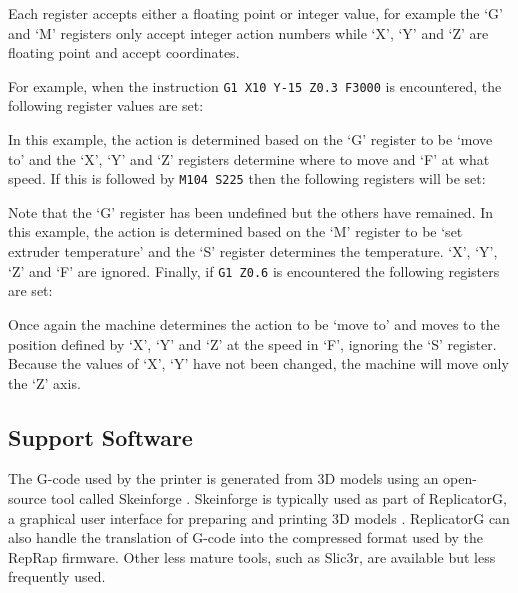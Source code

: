			Each register accepts either a floating point or integer value, for
			example the `G' and `M' registers only accept integer action numbers while
			`X', `Y' and `Z' are floating point and accept coordinates.
			
			For example, when the instruction \verb|G1 X10 Y-15 Z0.3 F3000| is encountered,
			the following register values are set:
			
			\begin{gcoderegs}
			\end{gcoderegs}
			
			In this example, the action is determined based on the `G' register to be
			`move to' and the `X', `Y' and `Z' registers determine where to move and
			`F' at what speed. If this is followed by \verb|M104 S225| then the
			following registers will be set:
			
			\begin{gcoderegs}
				\reg{F}{3000}
				\reg{M}{104}
				\reg{S}{225}
				\reg{X}{10}
				\reg{Y}{-15}
				\reg{Z}{0.3}
			\end{gcoderegs}
			
			Note that the `G' register has been undefined but the others have
			remained. In this example, the action is determined based on the `M'
			register to be `set extruder temperature' and the `S' register determines
			the temperature. `X', `Y', `Z' and `F' are ignored. Finally, if
			\verb|G1 Z0.6| is encountered the following registers are set:
			
			\begin{gcoderegs}
				\reg{G}{1}
				\reg{Z}{0.6}
			\end{gcoderegs}
			
			Once again the machine determines the action to be `move to' and moves to
			the position defined by `X', `Y' and `Z' at the speed in `F', ignoring the
			`S' register.  Because the values of `X', `Y' have not been changed, the
			machine will move only the `Z' axis.
		
		\subsection{Support Software}
			
			The G-code used by the printer is generated from 3D models using an
			open-source tool called Skeinforge \cite{skeinforge}. Skeinforge is
			typically used as part of ReplicatorG, a graphical user interface for
			preparing and printing 3D models \cite{replicatorg}. ReplicatorG can also
			handle the translation of G-code into the compressed format used by the
			RepRap firmware.  Other less mature tools, such as Slic3r, are available
			but less frequently used.
		
